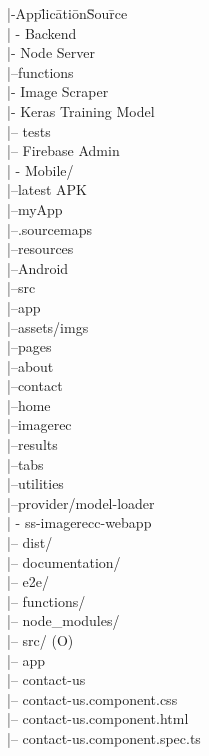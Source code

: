 \documentclass[a4paper, 11pt]{article}
\begin{document}
\begin{tabbing}
	
|-App\=lic\=ati\=on\=Sou\=rce\= \\
\>| -  Backend\\
\>\>|- Node Server\\
\> \> \> |--functions\\
\>\>|- Image Scraper\\
\>\>|- Keras Training Model\\
\> \> \> |-- tests\\
\> \>|-- Firebase Admin \\

\>| - Mobile/ \\
\>\>|--latest APK\\
\>\>|--myApp\\
\>\>\>|--.sourcemaps\\
\>\>\>|--resources\\
\>\>\>\>\>|--Android\\
\>\>\>|--src\\
\>\>\>\>\>|--app\\
\>\>\>\>\>|--assets/imgs\\
\>\>\>\>\>|--pages\\
\>\>\>\>\>\>|--about\\
\>\>\>\>\>\>|--contact\\
\>\>\>\>\>\>|--home\\
\>\>\>\>\>\>|--imagerec\\
\>\>\>\>\>\>|--results\\
\>\>\>\>\>\>|--tabs\\
\>\>\>\>\>\>|--utilities\\
\>\>\>\>\>|--provider/model-loader\\
\>| - ss-imagerecc-webapp\\
\>\>|-- dist/ \\
\>\>|-- documentation/ \\
\>\>|-- e2e/ \\
\>\>|-- functions/ \\
\>\>|-- node\_modules/ \\
\>\>|-- src/ (O)\\
\>\>\>|-- app\\
\>\>\>\>\>|-- contact-us\\
\>\>\>\>\>\>|-- contact-us.component.css\\
\>\>\>\>\>\>|-- contact-us.component.html\\
\>\>\>\>\>\>				|-- contact-us.component.spec.ts\\

\end{tabbing}
\end{document}
